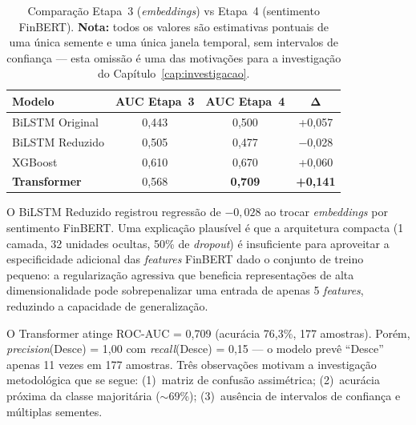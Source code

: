 \begin{table}[htb]
\centering
\caption{Comparação Etapa~3 (\textit{embeddings}) vs Etapa~4 (sentimento FinBERT). \textbf{Nota:} todos os valores são estimativas pontuais de uma única semente e uma única janela temporal, sem intervalos de confiança --- esta omissão é uma das motivações para a investigação do Capítulo~\ref{cap:investigacao}.}\label{tab:etapa4}
\begin{tabular}{lccc}
\toprule
\textbf{Modelo} & \textbf{AUC Etapa~3} & \textbf{AUC Etapa~4} & $\boldsymbol{\Delta}$ \\
\midrule
BiLSTM Original  & 0,443 & 0,500 & +0,057 \\
BiLSTM Reduzido  & 0,505 & 0,477 & $-$0,028 \\
XGBoost          & 0,610 & 0,670 & +0,060 \\
\textbf{Transformer} & 0,568 & \textbf{0,709} & \textbf{+0,141} \\
\bottomrule
\end{tabular}
\end{table}

O BiLSTM Reduzido registrou regressão de $-0{,}028$ ao trocar \textit{embeddings} por sentimento FinBERT. Uma explicação plausível é que a arquitetura compacta (1 camada, 32 unidades ocultas, 50\% de \textit{dropout}) é insuficiente para aproveitar a especificidade adicional das \textit{features} FinBERT dado o conjunto de treino pequeno: a regularização agressiva que beneficia representações de alta dimensionalidade pode sobrepenalizar uma entrada de apenas 5 \textit{features}, reduzindo a capacidade de generalização.

O Transformer atinge ROC-AUC = 0,709 (acurácia 76,3\%, 177 amostras). Porém, \textit{precision}(Desce) = 1,00 com \textit{recall}(Desce) = 0,15 --- o modelo prevê ``Desce'' apenas 11 vezes em 177 amostras. Três observações motivam a investigação metodológica que se segue: (1)~matriz de confusão assimétrica; (2)~acurácia próxima da classe majoritária ($\sim$69\%); (3)~ausência de intervalos de confiança e múltiplas sementes.


